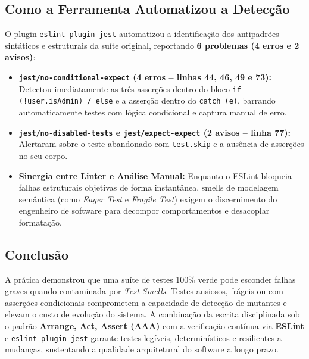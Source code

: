 \documentclass[11pt, a4paper]{article}
\begin{document}
\subsection{Como a Ferramenta Automatizou a Detecção}
O plugin \texttt{eslint-plugin-jest} automatizou a identificação dos antipadrões sintáticos e estruturais da suíte original, reportando \textbf{6 problemas (4 erros e 2 avisos)}:
\begin{itemize}
    \item \textbf{\texttt{jest/no-conditional-expect} (4 erros -- linhas 44, 46, 49 e 73):} Detectou imediatamente as três asserções dentro do bloco \texttt{if (!user.isAdmin) / else} e a asserção dentro do \texttt{catch (e)}, barrando automaticamente testes com lógica condicional e captura manual de erro.
    \item \textbf{\texttt{jest/no-disabled-tests} e \texttt{jest/expect-expect} (2 avisos -- linha 77):} Alertaram sobre o teste abandonado com \texttt{test.skip} e a ausência de asserções no seu corpo.
    \item \textbf{Sinergia entre Linter e Análise Manual:} Enquanto o ESLint bloqueia falhas estruturais objetivas de forma instantânea, smells de modelagem semântica (como \textit{Eager Test} e \textit{Fragile Test}) exigem o discernimento do engenheiro de software para decompor comportamentos e desacoplar formatação.
\end{itemize}

\subsection{Conclusão}
A prática demonstrou que uma suíte de testes 100\% verde pode esconder falhas graves quando contaminada por \textit{Test Smells}. Testes ansiosos, frágeis ou com asserções condicionais comprometem a capacidade de detecção de mutantes e elevam o custo de evolução do sistema. A combinação da escrita disciplinada sob o padrão \textbf{Arrange, Act, Assert (AAA)} com a verificação contínua via \textbf{ESLint} e \texttt{eslint-plugin-jest} garante testes legíveis, determinísticos e resilientes a mudanças, sustentando a qualidade arquitetural do software a longo prazo.
\end{document}
